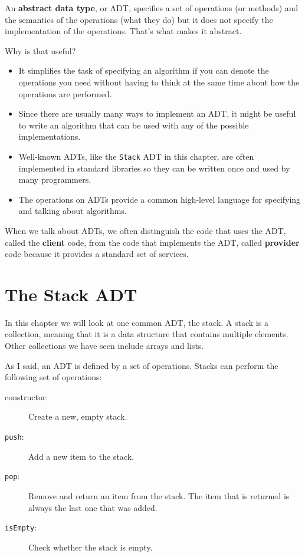 \documentclass[12pt]{book}
\theoremstyle{exercise}
\begin{document}
An {\bf abstract data type}, or ADT, specifies a set of operations (or
methods) and the semantics of the operations (what they do) but it
does not specify the implementation of the operations.  That's
what makes it abstract.

Why is that useful?

\begin{itemize}

\item It simplifies the task of specifying an algorithm if you
can denote the operations you need without having to think at the
same time about how the operations are performed.

\item Since there are usually many ways to implement an ADT,
it might be useful to write an algorithm that can be used with
any of the possible implementations.

\item Well-known ADTs, like the {\tt Stack} ADT in this chapter,
are often implemented in standard libraries so they can be written
once and used by many programmers.

\item The operations on ADTs provide a common high-level language
for specifying and talking about algorithms.

\end{itemize}

When we talk about ADTs, we often distinguish the code that uses
the ADT, called the {\bf client} code, from the code that implements
the ADT, called {\bf provider} code because it provides a standard
set of services.



\section{The Stack ADT}

In this chapter we will look at one common ADT, the stack.  A
stack is a collection, meaning that it is a data structure that
contains multiple elements.  Other collections we have seen include
arrays and lists.

As I said, an ADT is defined by a set of operations.
Stacks can perform the following set of operations:

\begin{description}

\item[constructor:] Create a new, empty stack.

\item[{\tt push}:] Add a new item to the stack.

\item[{\tt pop}:] Remove and return an item from the stack.  The item
that is returned is always the last one that was added.

\item[{\tt isEmpty}:] Check whether the stack is empty.

\end{description}
\end{document}
